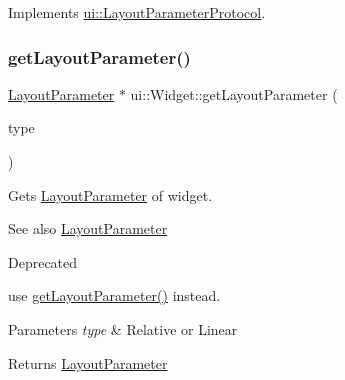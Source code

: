 Implements \hyperlink{classui_1_1LayoutParameterProtocol_a188012c584b8f9ccca95b1dffea6fb0b}{ui\+::\+Layout\+Parameter\+Protocol}.

\mbox{\label{classui_1_1Widget_a21caaf4dc8eb3c5b9e4ca4873ffc049d}} 
\subsubsection{\texorpdfstring{get\+Layout\+Parameter()}{getLayoutParameter()}\hspace{0.1cm}{\footnotesize\ttfamily [3/4]}}
{\footnotesize\ttfamily \hyperlink{classui_1_1LayoutParameter}{Layout\+Parameter} $\ast$ ui\+::\+Widget\+::get\+Layout\+Parameter (\begin{DoxyParamCaption}\item[{\hyperlink{classui_1_1LayoutParameter_a1b01e01e7e6fc3de80f2e6d07fae806e}{Layout\+Parameter\+::\+Type}}]{type }\end{DoxyParamCaption})}

Gets \hyperlink{classui_1_1LayoutParameter}{Layout\+Parameter} of widget.

\begin{DoxySeeAlso}{See also}
\hyperlink{classui_1_1LayoutParameter}{Layout\+Parameter} 
\end{DoxySeeAlso}
\begin{DoxyRefDesc}{Deprecated}
\item[\hyperlink{deprecated__deprecated000179}{Deprecated}]use {\ttfamily \hyperlink{classui_1_1Widget_a25425cde194b4f37f56f938bb69a9a96}{get\+Layout\+Parameter()}} instead. \end{DoxyRefDesc}

\begin{DoxyParams}{Parameters}
{\em type} & Relative or Linear \\
\hline
\end{DoxyParams}
\begin{DoxyReturn}{Returns}
\hyperlink{classui_1_1LayoutParameter}{Layout\+Parameter} 
\end{DoxyReturn}
\mbox{\label{classui_1_1Widget_a63167ea03dc8ad08303849cf18e8ca21}} 
